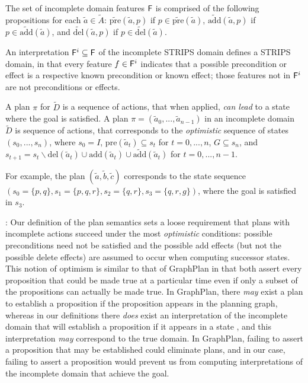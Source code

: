 \documentclass[letterpaper]{article}
\def\und#1{\noindent{\bf #1}:}
\def\citep#1{\cite{#1}}
\begin{document}
The set of incomplete domain features ${\sf F}$ is comprised of the
following propositions for each $\tilde{a} \in \tilde{A}$:
 $\widetilde{\text{pre}}(\tilde{a}, p)$ if $p \in
 \widetilde{\text{pre}}(\tilde{a})$, $\widetilde{\text{add}}(\tilde{a}, p)$ if
 $p \in \widetilde{\text{add}}(\tilde{a})$, and
 $\widetilde{\text{del}}(\tilde{a}, p)$ if $p \in
 \widetilde{\text{del}}(\tilde{a})$.

An interpretation ${\sf F}^i \subseteq {\sf F}$ of the
incomplete STRIPS domain defines a STRIPS domain, in that every feature $f \in
{\sf F}^i$ indicates that a possible precondition or effect is a
respective known precondition or known effect; those features not in ${\sf
F}^i$ are not preconditions or effects.

A plan $\pi$ for $\tilde{D}$ is a sequence of actions, that when applied, {\em
can lead} to a state where the goal is satisfied.  A plan $\pi = (\tilde{a}_0,
..., \tilde{a}_{n-1})$ in an incomplete domain $\tilde{D}$ is sequence of
actions, that corresponds to the {\em optimistic} sequence of states $(s_0, ...,
s_n)$, where $s_0 = I$, $\text{pre}(\tilde{a}_t) \subseteq s_t$ for $t = 0,...,
n$, $G \subseteq s_n$, and $s_{t+1} = s_t \backslash \text{del}(\tilde{a}_t)
\cup \text{add}(\tilde{a}_t) \cup \widetilde{\text{add}}(\tilde{a}_t)$ for $t =
0,..., n-1$.

For example, the plan $(\tilde{a}, \tilde{b}, \tilde{c})$ corresponds to the
state sequence $(s_0 = \{p, q\}, s_1 = \{p, q, r\}, s_2 = \{q, r\}, s_3 = \{q,
r, g\})$, where the goal is satisfied in $s_3$.


\und{Discussion} Our definition of the plan semantics sets a loose requirement
that plans with incomplete actions succeed under the most  {\em optimistic}
conditions:  possible preconditions need not be satisfied and the possible add
effects (but not the possible delete effects) are assumed to occur when
computing successor states. This notion of optimism is similar to that of
GraphPlan \citep{graphplan} in that  both assert every proposition that could be
made true at a particular time even if only a subset of the propositions can
actually be made true.  In GraphPlan, there {\em may} exist a plan to establish
a proposition if the proposition appears in the planning graph, whereas in our
definitions there {\em does} exist an interpretation of the incomplete domain
that will establish a proposition if it appears in a state
\citep{USU-CS-TR-11-001}, and this interpretation {\em may} correspond to the
true domain. In GraphPlan, failing to assert a proposition that may be
established could eliminate plans, and in our case, failing to assert a
proposition would prevent us from computing interpretations of the incomplete
domain that achieve the goal.
\end{document}

